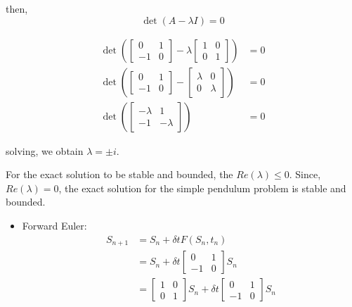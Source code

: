 \documentclass[a4paper,11pt]{report}
\begin{document}
\begin{enumerate}
    then,
    \begin{equation*}
    \det \left( A - \lambda I \right) = 0
    \end{equation*}

    \begin{equation*}
    \begin{aligned}
    \det \left( \begin{bmatrix} 0 & 1 \\ -1 & 0 \end{bmatrix} - \lambda \begin{bmatrix} 1 & 0 \\ 0 & 1 \end{bmatrix} \right) &= 0 \\
    \det \left( \begin{bmatrix} 0 & 1 \\ -1 & 0 \end{bmatrix} - \begin{bmatrix} \lambda & 0 \\ 0 & \lambda \end{bmatrix} \right) &= 0 \\
    \det \left( \begin{bmatrix} - \lambda & 1 \\ -1 & - \lambda \end{bmatrix} \right) &= 0
    \end{aligned}
    \end{equation*}

    solving, we obtain $\lambda = \pm i$.

    For the exact solution to be stable and bounded, the $Re(\lambda) \le 0$. 
    Since, $Re(\lambda) = 0$, the exact solution for the simple pendulum problem
    is stable and bounded.

    \begin{itemize}
    \item Forward Euler:
    \begin{equation*}
    \begin{aligned}
    S_{n+1} &= S_{n} + \delta t F(S_{n}, t_{n}) \\
            &= S_{n} + \delta t \begin{bmatrix} 0 & 1 \\ -1 & 0 \end{bmatrix} S_{n} \\
            &= \begin{bmatrix} 1 & 0 \\ 0 & 1 \end{bmatrix} S_{n} + \delta t \begin{bmatrix} 0 & 1 \\ -1 & 0 \end{bmatrix} S_{n}
    \end{aligned}
    \end{equation*} 


\end{itemize}
\end{enumerate}
\end{document}
